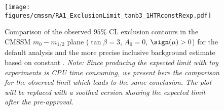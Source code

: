 \begin{figure}[h]
   \begin{center}
     \texttt{[image: figures/cmssm/RA1\_ExclusionLimit\_tanb3\_1HTRconstRexp.pdf]} 
     \caption{\label{fig:RA1_flat_RaT_tanb3} Comparison of the
       observed %
       $95\%$ CL exclusion contours in the CMSSM $m_0 - m_{1/2}$ plane
       ($\tan \beta = 3$, $A_0 = 0$, $\sign(\mu)>0$) for the default
       analysis and the more precise inclusive background estimate
       based on constant \RaT. {\it Note: Since producing the expected limit with toy experiments is CPU time consuming, we present here the comparison for the observed limit which leads to the same conclusion. The plot will be replaced with a soothed version showing the expected limit after the pre-approval.} }
\end{center}
\end{figure}





